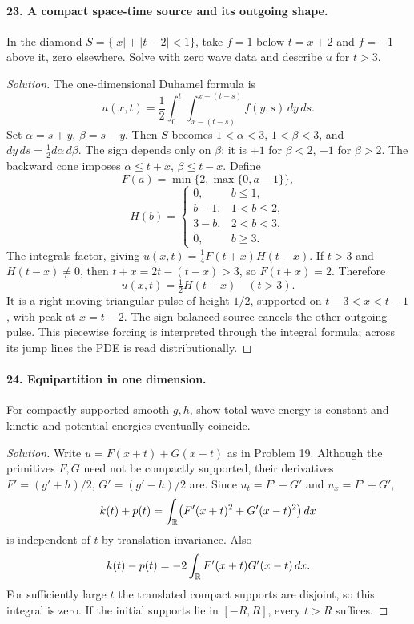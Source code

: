 \paragraph{23. A compact space-time source and its outgoing shape.}
In the diamond $S=\{|x|+|t-2|<1\}$, take $f=1$ below $t=x+2$
and $f=-1$ above it, zero elsewhere. Solve with zero wave data
and describe $u$ for $t>3$.
\begin{proof}[Solution]
The one-dimensional Duhamel formula is
\[
 u(x,t)=\frac12\int_0^t
                 \int_{x-(t-s)}^{x+(t-s)}f(y,s)\,dy\,ds.
\]
Set $\alpha=s+y$, $\beta=s-y$.
Then $S$ becomes $1<\alpha<3$, $1<\beta<3$,
and $dy\,ds=\tfrac12d\alpha\,d\beta$.
The sign depends only on $\beta$: it is $+1$ for $\beta<2$,
$-1$ for $\beta>2$.
The backward cone imposes $\alpha\leq t+x$, $\beta\leq t-x$.
Define
\[
 F(a)=\min\{2,\max\{0,a-1\}\},
\]
\[
 H(b)=
 \begin{cases}
 0,&b\leq1,\\
 b-1,&1<b\leq2,\\
 3-b,&2<b<3,\\
 0,&b\geq3.
 \end{cases}
\]
The integrals factor, giving $u(x,t)=\tfrac14F(t+x)H(t-x)$.
If $t>3$ and $H(t-x)\ne0$, then $t+x=2t-(t-x)>3$,
so $F(t+x)=2$. Therefore
\[
 u(x,t)=\tfrac12H(t-x)\quad(t>3).
\]
It is a right-moving triangular pulse of height $1/2$, supported on
$t-3<x<t-1$, with peak at $x=t-2$. The sign-balanced source cancels
the other outgoing pulse.
This piecewise forcing is interpreted through the integral formula;
across its jump lines the PDE is read distributionally.
\end{proof}
\Needspace{45mm}

\paragraph{24. Equipartition in one dimension.}
For compactly supported smooth $g,h$, show total wave energy is constant
and kinetic and potential energies eventually coincide.
\begin{proof}[Solution]
Write $u=F(x+t)+G(x-t)$ as in Problem 19.
Although the primitives $F,G$ need not be compactly supported,
their derivatives $F'=(g'+h)/2$, $G'=(g'-h)/2$ are.
Since $u_t=F'-G'$ and $u_x=F'+G'$,
\[
 k(t)+p(t)=\int_{\mathbb{R}}\bigl(F'(x+t)^2+G'(x-t)^2\bigr)\,dx
\]
is independent of $t$ by translation invariance. Also
\[
 k(t)-p(t)=-2\int_{\mathbb{R}} F'(x+t)G'(x-t)\,dx.
\]
For sufficiently large $t$ the translated compact supports are disjoint,
so this integral is zero. If the initial supports lie in $[-R,R]$,
every $t>R$ suffices.
\end{proof}
